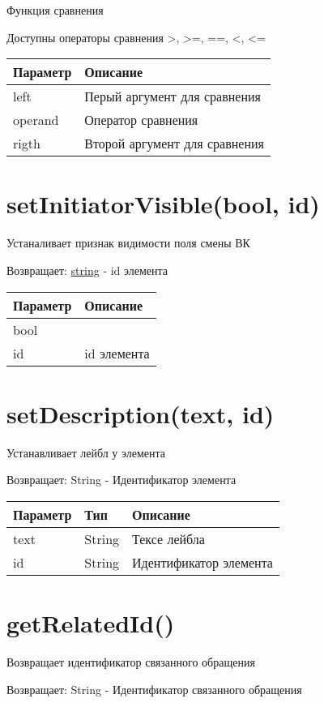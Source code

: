 Функция сравнения

Доступны операторы сравнения \textgreater, \textgreater=, ==, \textless,
\textless=


\begin{longtable}[]{@{}ll@{}}
\toprule
Параметр & Описание\tabularnewline
\midrule
\endhead
left & Перый аргумент для сравнения\tabularnewline
operand & Оператор сравнения\tabularnewline
rigth & Второй аргумент для сравнения\tabularnewline
\bottomrule
\end{longtable}

\hypertarget{setinitiatorvisiblebool-id-string}{%
\section{setInitiatorVisible(bool, id)}\label{setinitiatorvisiblebool-id-string}}

Устаналивает признак видимости поля смены ВК

Возвращает: \protect\hyperlink{string}{string} - id элемента

\begin{longtable}[]{@{}ll@{}}
\toprule
Параметр & Описание\tabularnewline
\midrule
\endhead
bool &\tabularnewline
id & id элемента\tabularnewline
\bottomrule
\end{longtable}

\hypertarget{setdescriptiontext-id-string}{%
\section{setDescription(text, id)}\label{setdescriptiontext-id-string}}

Устанавливает лейбл у элемента

Возвращает: String - Идентификатор элемента

\begin{longtable}[]{@{}lll@{}}
\toprule
Параметр & Тип & Описание\tabularnewline
\midrule
\endhead
text & String & Тексе лейбла\tabularnewline
id & String & Идентификатор элемента\tabularnewline
\bottomrule
\end{longtable}

\hypertarget{getrelatedid-string}{%
\section{getRelatedId()}\label{getrelatedid-string}}

Возвращает идентификатор связанного обращения

Возвращает: String - Идентификатор связанного обращения\\

